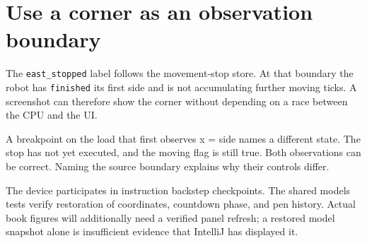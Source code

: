 \section{Use a corner as an observation
  boundary}\label{006-marsbot-square-p07-use-a-corner-as-an-observation-boundary}

The \texttt{east\_stopped} label follows the movement-stop store. At
that boundary the robot has \texttt{finished} its first side and is not
accumulating further moving ticks. A screenshot can therefore show the
corner without depending on a race between the CPU and the UI.

A breakpoint on the load that first observes x = side names a different
state. The stop has not yet executed, and the moving flag is still true.
Both observations can be correct. Naming the source boundary explains
why their controls differ.

The device participates in instruction backstep checkpoints. The shared
model\textquotesingle s tests verify restoration of coordinates,
countdown phase, and pen history. Actual book figures will additionally
need a verified panel refresh; a restored model snapshot alone is
insufficient evidence that IntelliJ has displayed it.
